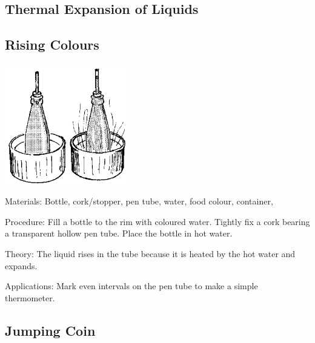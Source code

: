 \begin{multicols}{2}

\section*{Thermal Expansion of Liquids}


\subsection{Rising Colours}

\begin{center}
\includegraphics[width=0.4\textwidth]{./img/source/rising-colours.png}
\end{center}

\begin{description*}
\item[Materials:]{Bottle, cork/stopper, pen tube, water, food colour, container, }
\item[Procedure:]{Fill a bottle to the rim with coloured water. Tightly fix a cork bearing a transparent hollow pen tube. Place the bottle in hot water.}
\item[Theory:]{The liquid rises in the tube because it is heated by the hot water and expands.}
\item[Applications:]{Mark even intervals on the pen tube to make a simple thermometer.}
\end{description*}

\subsection{Jumping Coin}


\end{multicols}
